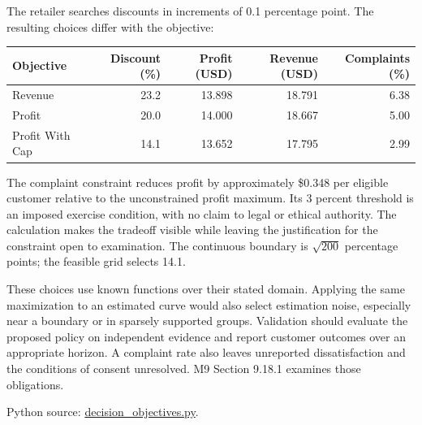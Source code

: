 The retailer searches discounts in increments of 0.1 percentage point.
The resulting choices differ with the objective:

\begin{table}[H]
\centering\small
\begin{tabular}{@{}lrrrr@{}}
\toprule
Objective & Discount (\%) & Profit (USD) & Revenue (USD) & Complaints
(\%) \\
\midrule

Revenue & 23.2 & 13.898 & 18.791 & 6.38 \\
Profit & 20.0 & 14.000 & 18.667 & 5.00 \\
Profit With Cap & 14.1 & 13.652 & 17.795 & 2.99 \\
\bottomrule
\end{tabular}
\end{table}

The complaint constraint reduces profit by approximately \$0.348 per
eligible customer relative to the unconstrained profit maximum. Its 3
percent threshold is an imposed exercise condition, with no claim to
legal or ethical authority. The calculation makes the tradeoff visible
while leaving the justification for the constraint open to examination.
The continuous boundary is \(\sqrt{200}\) percentage points; the
feasible grid selects 14.1.

These choices use known functions over their stated domain. Applying the
same maximization to an estimated curve would also select estimation
noise, especially near a boundary or in sparsely supported groups.
Validation should evaluate the proposed policy on independent evidence
and report customer outcomes over an appropriate horizon. A complaint
rate also leaves unreported dissatisfaction and the conditions of
consent unresolved. M9 Section 9.18.1 examines those obligations.

\FloatBarrier
{}
Python source:
\href{../03_Data_and_Code/Dose_Response/decision_objectives.py}{decision\_objectives.py}.

